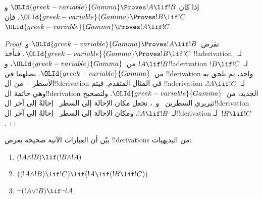 \documentclass[../../../include/open-logic-section]{subfiles}
\begin{document}
\begin{prop}
   إذا كان ${\OLId{greek-variable}{Gamma}} \Proves !A \lif !B$ و${\OLId{greek-variable}{Gamma}}
  \Proves !B \lif !C$، فإن ${\OLId{greek-variable}{Gamma}} \Proves !A \lif !C$.
\end{prop}

\begin{proof}
  نفرض~${\OLId{greek-variable}{Gamma}} \Proves !A \lif !B$ و${\OLId{greek-variable}{Gamma}} \Proves !B \lif
  !C$. فنأخذ !!a{derivation} لـ~$!A \lif !B$ من~${\OLId{greek-variable}{Gamma}}$،
  و!!a{derivation} لـ~$!B \lif !C$ من~${\OLId{greek-variable}{Gamma}}$.
  نصلهما في !!{derivation} واحد، ثم نلحق به الأسطر~--
  من ال!!{derivation} في المثال المتقدم. فيتم !!a{derivation}
  لـ~$!A \lif !C$، وهي خاتمة ال!!{derivation} الجديد،
  من~${\OLId{greek-variable}{Gamma}}$. ولتصحيح تبريري السطرين~ و~، نجعل مكان الإحالة
  إلى السطر~ إحالةً إلى آخر ال!!{derivation} لـ~$!A
  \lif !B$، ومكان الإحالة إلى السطر~ إحالةً إلى آخر
  ال!!{derivation} لـ~$!B \lif !C$.
\end{proof}

\begin{prob}
بيّن أن العبارات الآتية صحيحة بعرض !!{derivation}s من البديهيات:
\begin{enumerate}
\item $(!A \land !B) \lif (!B \land !A)$
\item $((!A \land !B) \lif !C) \lif (!A \lif (!B \lif !C))$
\item $\lnot(!A \lor !B) \lif \lnot !A$.
\end{enumerate}
\end{prob}
\end{document}
